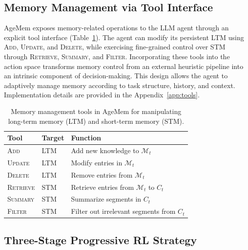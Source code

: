 \subsection{Memory Management via Tool Interface}

AgeMem exposes memory-related operations to the LLM agent through an explicit tool interface (Table~\ref{tab:tools}). The agent can modify its persistent LTM using \textsc{Add}, \textsc{Update}, and \textsc{Delete}, while exercising fine-grained control over STM through \textsc{Retrieve}, \textsc{Summary}, and \textsc{Filter}. Incorporating these tools into the action space transforms memory control from an external heuristic pipeline into an intrinsic component of decision-making. This design allows the agent to adaptively manage memory according to task structure, history, and context. Implementation details are provided in the Appendix~\ref{app:tools}.

\begin{table}[t]
\centering
\caption{Memory management tools in AgeMem for manipulating long-term memory (LTM) and short-term memory (STM).}
\label{tab:tools}
\small
\begin{tabular}{@{}lll@{}}
\toprule
\textbf{Tool} & \textbf{Target} & \textbf{Function} \\
\midrule
\textsc{Add}      & LTM & Add new knowledge to $\mathcal{M}_t$ \\
\textsc{Update}   & LTM & Modify entries in $\mathcal{M}_t$ \\
\textsc{Delete}   & LTM & Remove entries from $\mathcal{M}_t$ \\
\midrule
\textsc{Retrieve} & STM & Retrieve entries from $\mathcal{M}_t$ to $C_t$ \\
\textsc{Summary}  & STM & Summarize segments in $C_t$ \\
\textsc{Filter}    & STM & Filter out irrelevant segments from $C_t$ \\
\bottomrule
\end{tabular}
\end{table}


\subsection{Three-Stage Progressive RL Strategy}

